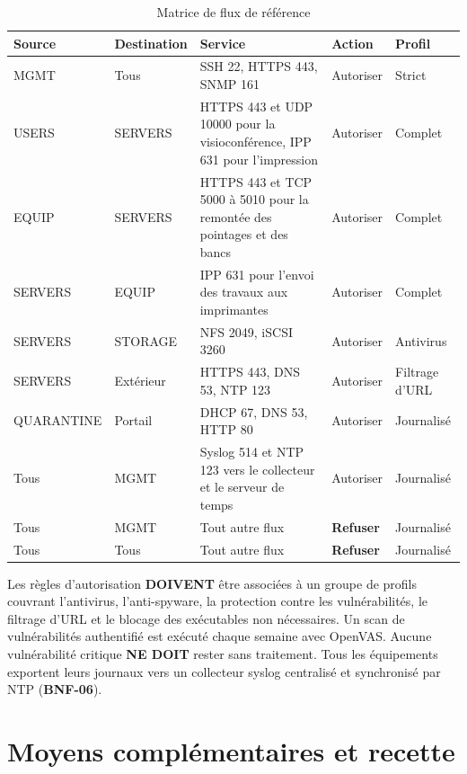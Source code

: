 \documentclass[11pt,a4paper]{article}
\newcommand{\rid}[1]{\textcolor{primary}{\textbf{\small #1}}}
\begin{document}
\begin{table}[H]
\centering
\caption{Matrice de flux de référence}
\begin{tabularx}{\textwidth}{L{2.45cm} L{2.1cm} Y C{1.55cm} L{1.75cm}}
\toprule
{}\textbf{Source} & \textbf{Destination} & \textbf{Service} & \textbf{Action} & \textbf{Profil} \\
\midrule
MGMT & Tous & SSH 22, HTTPS 443, SNMP 161 & Autoriser & Strict \\
USERS & SERVERS & HTTPS 443 et UDP 10000 pour la visioconférence, IPP 631 pour l'impression & Autoriser & Complet \\
EQUIP & SERVERS & HTTPS 443 et TCP 5000 à 5010 pour la remontée des pointages et des bancs & Autoriser & Complet \\
SERVERS & EQUIP & IPP 631 pour l'envoi des travaux aux imprimantes & Autoriser & Complet \\
SERVERS & STORAGE & NFS 2049, iSCSI 3260 & Autoriser & Antivirus \\
SERVERS & Extérieur & HTTPS 443, DNS 53, NTP 123 & Autoriser & Filtrage d'URL \\
QUARANTINE & Portail & DHCP 67, DNS 53, HTTP 80 & Autoriser & Journalisé \\
Tous & MGMT & Syslog 514 et NTP 123 vers le collecteur et le serveur de temps & Autoriser & Journalisé \\
Tous & MGMT & Tout autre flux & \textbf{Refuser} & Journalisé \\
Tous & Tous & Tout autre flux & \textbf{Refuser} & Journalisé \\
\bottomrule
\end{tabularx}
\end{table}

Les règles d'autorisation \textbf{DOIVENT} être associées à un groupe de profils couvrant l'antivirus, l'anti-spyware, la protection contre les vulnérabilités, le filtrage d'URL et le blocage des exécutables non nécessaires. Un scan de vulnérabilités authentifié est exécuté chaque semaine avec OpenVAS. Aucune vulnérabilité critique \textbf{NE DOIT} rester sans traitement. Tous les équipements exportent leurs journaux vers un collecteur syslog centralisé et synchronisé par NTP (\rid{BNF-06}).

\section{Moyens complémentaires et recette}
\end{document}
